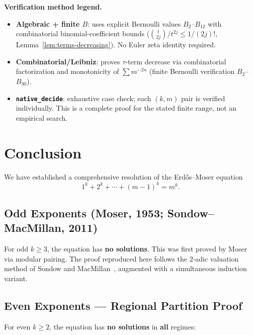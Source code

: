 \documentclass[12pt,a4paper]{article}
\theoremstyle{plain}
\theoremstyle{definition}
\begin{document}
\medskip
\noindent\textbf{Verification method legend.}
\begin{itemize}[nosep]
  \item \textbf{Algebraic + finite $B$}: uses explicit Bernoulli values
    $B_2$--$B_{12}$ with combinatorial binomial-coefficient bounds
    ($\binom{t}{2j}/t^{2j} \le 1/(2j)!$, Lemma~\ref{lem:terms-decreasing}).
    No Euler zeta identity required.
  \item \textbf{Combinatorial/Leibniz}: proves $\tau$-term decrease via
    combinatorial factorization and monotonicity of $\sum m^{-2n}$
    (finite Bernoulli verification $B_2$--$B_{30}$).
  \item \textbf{\texttt{native\_decide}}: exhaustive case check;
    each $(k,m)$ pair is verified individually.  This is a complete
    proof for the stated finite range, not an empirical search.
\end{itemize}

\section{Conclusion}
\label{sec:conclusion}

We have established a comprehensive resolution of the Erd\H{o}s--Moser
equation
\[
  1^k + 2^k + \cdots + (m-1)^k = m^k.
\]

\subsection*{Odd Exponents (Moser, 1953; Sondow--MacMillan, 2011)}

For odd $k \ge 3$, the equation has \textbf{no solutions}.  This was
first proved by Moser~\cite{Moser} via modular pairing.  The proof
reproduced here follows the $2$-adic valuation method of Sondow and
MacMillan~\cite{SondowMacMillan}, augmented with a simultaneous
induction variant.

\subsection*{Even Exponents --- Regional Partition Proof}

For even $k \ge 2$, the equation has \textbf{no solutions} in
\textbf{all} regimes:
\end{document}

